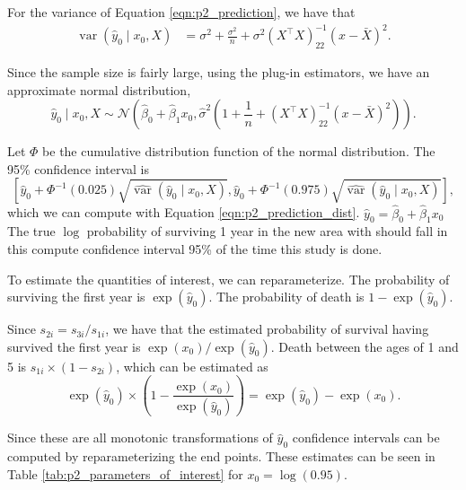 \documentclass[letterpaper,11pt]{article}
\begin{document}
\begin{enumerate}
\begin{enumerate}
\begin{description}
    For the variance of Equation \ref{eqn:p2_prediction}, we have that
    \begin{align*}
      \operatorname{var}\left(
      \hat{y}_0
      \mid x_0, X
      \right)
      &= \sigma^2 + \frac{\sigma^2}{n} + \sigma^2\left(X^\intercal X\right)^{-1}_{22}
        \left(x - \bar{X}\right)^2.
    \end{align*}
    
    Since the sample size is fairly large, using the plug-in estimators, we have
    an approximate normal distribution,
    \begin{equation}
      \hat{y}_0 \mid x_0, X \sim \mathcal{N}\left(
        \hat{\beta}_0 + \hat{\beta}_1x_0,
        \hat{\sigma}^2\left(
          1 + \frac{1}{n} + \left(X^\intercal X\right)^{-1}_{22}\left(x - \bar{X}\right)^2
        \right)
      \right).
      \label{eqn:p2_prediction_dist}
    \end{equation}

    Let $\Phi$ be the cumulative distribution function of the normal
    distribution. The 95\% confidence interval is
    \[
      \left[
        \hat{y}_0 + \Phi^{-1}\left(0.025\right)
        \sqrt{\hat{\operatorname{var}}\left(\hat{y}_0 \mid x_0, X\right)},
        \hat{y}_0 + \Phi^{-1}\left(0.975\right)
        \sqrt{\hat{\operatorname{var}}\left(\hat{y}_0 \mid x_0, X\right)}
      \right],
    \]
    which we can compute with Equation \ref{eqn:p2_prediction_dist}.
    $\hat{y}_0 = \hat{\beta}_0 + \hat{\beta}_1x_0$ The true $\log$ probability
    of surviving 1 year in the new area with should fall in this compute
    confidence interval 95\% of the time this study is done.

    To estimate the quantities of interest, we can reparameterize. The
    probability of surviving the first year is $\exp\left(\hat{y}_0\right)$. The
    probability of death is $1 - \exp\left(\hat{y}_0\right)$.

    Since $s_{2i} = s_{3i}/s_{1i}$, we have that the estimated probability of
    survival having survived the first year is
    $\exp\left(x_0\right)/\exp\left(\hat{y}_0\right)$. Death between the ages of
    1 and 5 is $s_{1i} \times \left(1 - s_{2i}\right)$, which can be estimated
    as \[     
      \exp\left(\hat{y}_0\right) \times \left(1 -
        \frac{\exp\left(x_0\right)}{\exp\left(\hat{y}_0\right)}\right)
      = \exp\left(\hat{y}_0\right) - \exp\left(x_0\right).
    \]
    
    Since these are all monotonic transformations of $\hat{y}_0$ confidence
    intervals can be computed by reparameterizing the end points. These
    estimates can be seen in Table \ref{tab:p2_parameters_of_interest} for
    $x_0 = \log\left(0.95\right)$.


\end{description}
\end{enumerate}
\end{enumerate}
\end{document}
